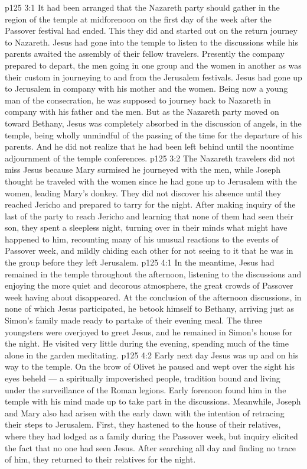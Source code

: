 \vs p125 3:1 It had been arranged that the Nazareth party should gather in the region of the temple at midforenoon on the first day of the week after the Passover festival had ended. This they did and started out on the return journey to Nazareth. Jesus had gone into the temple to listen to the discussions while his parents awaited the assembly of their fellow travelers. Presently the company prepared to depart, the men going in one group and the women in another as was their custom in journeying to and from the Jerusalem festivals. Jesus had gone up to Jerusalem in company with his mother and the women. Being now a young man of the consecration, he was supposed to journey back to Nazareth in company with his father and the men. But as the Nazareth party moved on toward Bethany, Jesus was completely absorbed in the discussion of angels, in the temple, being wholly unmindful of the passing of the time for the departure of his parents. And he did not realize that he had been left behind until the noontime adjournment of the temple conferences.
\vs p125 3:2 The Nazareth travelers did not miss Jesus because Mary surmised he journeyed with the men, while Joseph thought he traveled with the women since he had gone up to Jerusalem with the women, leading Mary’s donkey. They did not discover his absence until they reached Jericho and prepared to tarry for the night. After making inquiry of the last of the party to reach Jericho and learning that none of them had seen their son, they spent a sleepless night, turning over in their minds what might have happened to him, recounting many of his unusual reactions to the events of Passover week, and mildly chiding each other for not seeing to it that he was in the group before they left Jerusalem.
\vs p125 4:1 In the meantime, Jesus had remained in the temple throughout the afternoon, listening to the discussions and enjoying the more quiet and decorous atmosphere, the great crowds of Passover week having about disappeared. At the conclusion of the afternoon discussions, in none of which Jesus participated, he betook himself to Bethany, arriving just as Simon’s family made ready to partake of their evening meal. The three youngsters were overjoyed to greet Jesus, and he remained in Simon’s house for the night. He visited very little during the evening, spending much of the time alone in the garden meditating.
\vs p125 4:2 Early next day Jesus was up and on his way to the temple. On the brow of Olivet he paused and wept over the sight his eyes beheld --- a spiritually impoverished people, tradition bound and living under the surveillance of the Roman legions. Early forenoon found him in the temple with his mind made up to take part in the discussions. Meanwhile, Joseph and Mary also had arisen with the early dawn with the intention of retracing their steps to Jerusalem. First, they hastened to the house of their relatives, where they had lodged as a family during the Passover week, but inquiry elicited the fact that no one had seen Jesus. After searching all day and finding no trace of him, they returned to their relatives for the night.
